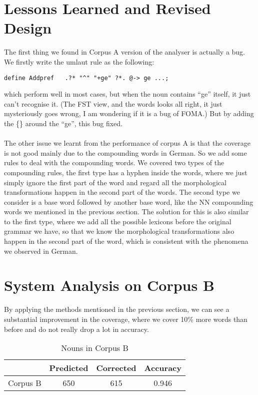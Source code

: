 \documentclass[11pt,letterpaper]{article}
\begin{document}
\section{Lessons Learned and Revised Design}
The first thing we found in Corpus A version of the analyser is actually a bug. We firstly write the umlaut rule as the following:
\begin{verbatim}
define Addpref   .?* "^" "+ge" ?*. @-> ge ...;
\end{verbatim}
which perform well in most cases, but when the noun contains ``ge'' itself, it just can't recognise it. (The FST view, and the words looks all right, it just mysteriously goes wrong, I am wondering if it is a bug of FOMA.) But by adding the \{\} around the ``ge'', this bug fixed.\\\\
The other issue we learnt from the performance of corpus A is that the coverage is not good mainly due to the compounding words in German. So we add some rules to deal with the compounding words. We covered two types of the compounding rules, the first type has a hyphen inside the words, where we just simply ignore the first part of the word and regard all the morphological transformations happen in the second part of the words. The second type we consider is a base word followed by another base word, like the NN compounding words we mentioned in the previous section. The solution for this is also similar to the first type, where we add all the possible lexicons before the original grammar we have, so that we know the morphological transformations also happen in the second part of the word, which is consistent with the phenomena we observed in German.
\section{System Analysis on Corpus B}
By applying the methods mentioned in the previous section, we can see a substantial improvement in the coverage, where we cover 10\% more words than before and do not really drop a lot in accuracy. 
\begin{table}[h]
\begin{center}
\begin{tabular}{|c|ccc|}
\hline 
 & Predicted & Corrected & Accuracy \\ 
\hline 
Corpus B & 650 & 615 & 0.946 \\ 
\hline 
\end{tabular} 
\end{center}
\caption{Nouns in Corpus B}
\end{table}
\end{document}
